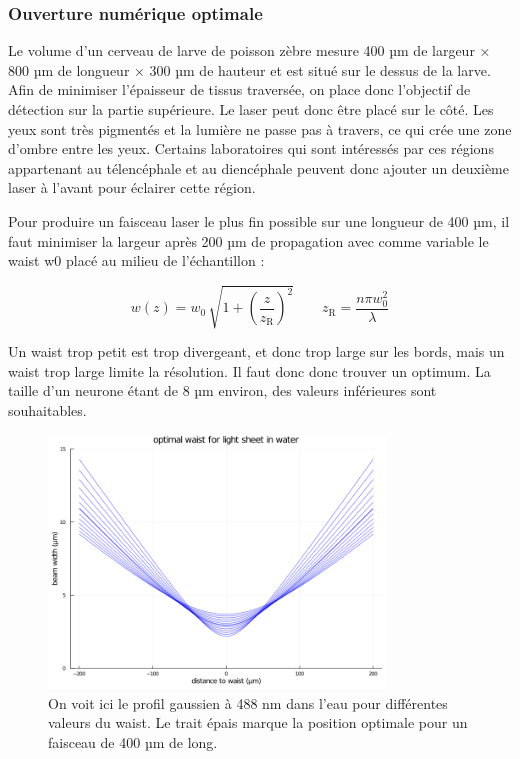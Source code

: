 \subsubsection{Ouverture numérique optimale}

Le volume d'un cerveau de larve de poisson zèbre mesure 400 µm de largeur × 800 µm de longueur × 300 µm de hauteur et est situé sur le dessus de la larve. Afin de minimiser l'épaisseur de tissus traversée, on place donc l'objectif de détection sur la partie supérieure. Le laser peut donc être placé sur le côté. Les yeux sont très pigmentés et la lumière ne passe pas à travers, ce qui crée une zone d'ombre entre les yeux. Certains laboratoires qui sont intéressés par ces régions appartenant au télencéphale et au diencéphale peuvent donc ajouter un deuxième laser à l'avant pour éclairer cette région.

Pour produire un faisceau laser le plus fin possible sur une longueur de 400 µm, il faut minimiser la largeur après 200 µm de propagation avec comme variable le waist w0 placé au milieu de l'échantillon :

$$
w(z) = w_0 \, \sqrt{ 1+ {\left( \frac{z}{z_\mathrm{R}} \right)}^2 } \qquad z_\mathrm{R} = \frac{n \pi w_0^2 }{\lambda}
$$

Un waist trop petit est trop divergeant, et donc trop large sur les bords, mais un waist trop large limite la résolution. Il faut donc donc trouver un optimum. La taille d'un neurone étant de 8 µm environ, des valeurs inférieures sont souhaitables.

\begin{figure}
\centering
\includegraphics[width=0.8\textwidth]{./files/possible-waist_1P.png}
\caption{On voit ici le profil gaussien à 488 nm dans l'eau pour différentes valeurs du waist. Le trait épais marque la position optimale pour un faisceau de 400 µm de long.}
\end{figure}

